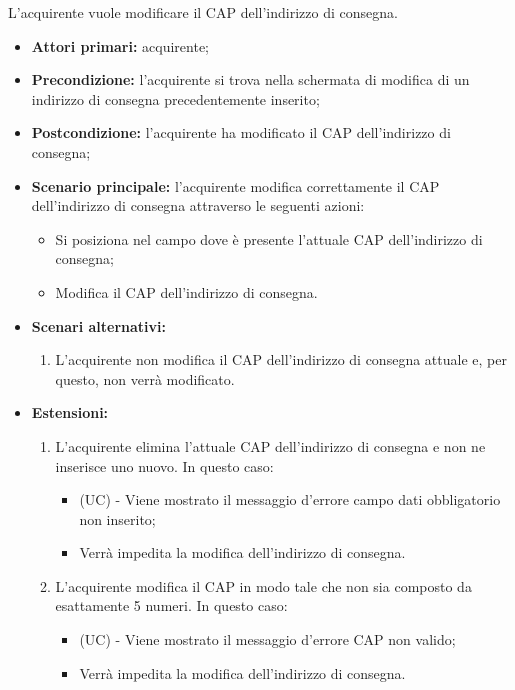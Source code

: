L'acquirente vuole modificare il CAP dell'indirizzo di consegna.
\begin{itemize}
    \item \textbf{Attori primari:} acquirente;
    \item \textbf{Precondizione:} l'acquirente si trova nella schermata di modifica di un indirizzo di consegna precedentemente inserito;
    \item \textbf{Postcondizione:} l'acquirente ha modificato il CAP dell'indirizzo di consegna;
    \item \textbf{Scenario principale:} l'acquirente modifica correttamente il CAP dell'indirizzo di consegna attraverso le seguenti azioni:
    \begin{itemize}
        \item Si posiziona nel campo dove è presente l'attuale CAP dell'indirizzo di consegna;
        \item Modifica il CAP dell'indirizzo di consegna.
    \end{itemize}
    \item \textbf{Scenari alternativi:}
    \begin{enumerate}[label=\lett]
        \item L'acquirente non modifica il CAP dell'indirizzo di consegna attuale e, per questo, non verrà modificato.
    \end{enumerate}
    \item \textbf{Estensioni:}
    \begin{enumerate}[label=\lett]
        \item L'acquirente elimina l'attuale CAP dell'indirizzo di consegna e non ne inserisce uno nuovo. In questo caso:
        \begin{itemize}
            \item (UC) - Viene mostrato il messaggio d'errore campo dati obbligatorio non inserito;
            \item Verrà impedita la modifica dell'indirizzo di consegna.
        \end{itemize}
        \item L'acquirente modifica il CAP in modo tale che non sia composto da esattamente 5 numeri. In questo caso:
        \begin{itemize}
            \item (UC) - Viene mostrato il messaggio d'errore CAP non valido;
            \item Verrà impedita la modifica dell'indirizzo di consegna.
        \end{itemize}
    \end{enumerate}
\end{itemize}

